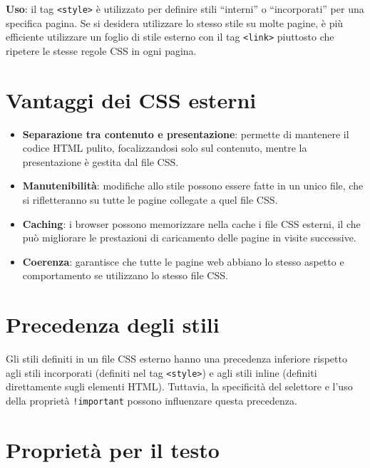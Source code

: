 \textbf{Uso}: il tag \texttt{<style>} è utilizzato per definire stili ``interni'' o ``incorporati'' per una specifica pagina. Se si desidera utilizzare lo stesso stile su molte pagine, è più efficiente utilizzare un foglio di stile esterno con il tag \texttt{<link>} piuttosto che ripetere le stesse regole CSS in ogni pagina.

\section{Vantaggi dei CSS esterni}

\begin{itemize}
    \item \textbf{Separazione tra contenuto e presentazione}: permette di mantenere il codice HTML pulito, focalizzandosi solo sul contenuto, mentre la presentazione è gestita dal file CSS.
    \item \textbf{Manutenibilità}: modifiche allo stile possono essere fatte in un unico file, che si rifletteranno su tutte le pagine collegate a quel file CSS.
    \item \textbf{Caching}: i browser possono memorizzare nella cache i file CSS esterni, il che può migliorare le prestazioni di caricamento delle pagine in visite successive.
    \item \textbf{Coerenza}: garantisce che tutte le pagine web abbiano lo stesso aspetto e comportamento se utilizzano lo stesso file CSS.
\end{itemize}

\section{Precedenza degli stili}

Gli stili definiti in un file CSS esterno hanno una precedenza inferiore rispetto agli stili incorporati (definiti nel tag \texttt{<style>}) e agli stili inline (definiti direttamente sugli elementi HTML). Tuttavia, la specificità del selettore e l'uso della proprietà \texttt{!important} possono influenzare questa precedenza.

\section{Proprietà per il testo}

